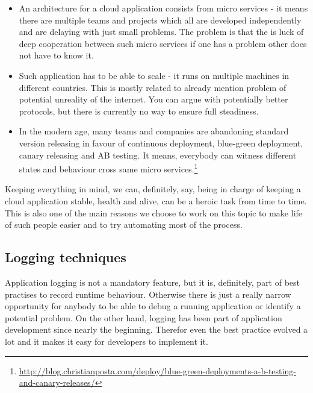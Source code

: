 \begin{itemize}
    \item An architecture for a cloud application consists from micro services - it means there are multiple teams and projects which all are developed independently and are delaying with just small problems. The problem is that the is luck of deep cooperation between such micro services if one has a problem other does not have to know it.
    \item Such application has to be able to scale - it runs on multiple machines in different countries. This is mostly related to already mention problem of potential unreality of the internet. You can argue with potentially better protocols, but there is currently no way to ensure full steadiness.
    \item In the modern age, many teams and companies are abandoning standard version releasing in favour of continuous deployment, blue-green deployment, canary releasing and AB testing. It means, everybody can witness different states and behaviour cross same micro services.\footnote{\url{http://blog.christianposta.com/deploy/blue-green-deployments-a-b-testing-and-canary-releases/}}
\end{itemize}
Keeping everything in mind, we can, definitely, say, being in charge of keeping a cloud application stable, health and alive, can be a heroic task from time to time. This is also one of the main reasons we choose to work on this topic to make life of such people easier and to try automating most of the process.

\subsection{Logging techniques}
\label{ssec:sota_logging_logging}

Application logging is not a mandatory feature, but it is, definitely, part of best practises to record runtime behaviour. Otherwise there is just a really narrow opportunity for anybody to be able to debug a running application or identify a potential problem. On the other hand, logging has been part of application development since nearly the beginning. Therefor even the best practice evolved a lot and it makes it easy for developers to implement it. 


